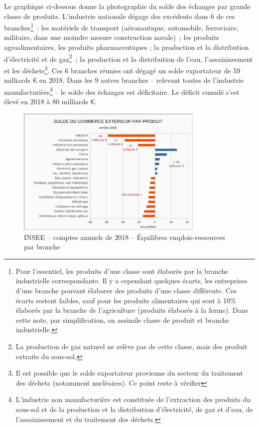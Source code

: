\documentclass[a4paper]{article}
\begin{document}
Le graphique ci-dessous donne la photographie du solde des échanges par grande classe de produits. L’industrie nationale dégage des excédents dans 6 de ces branches\footnote{Pour l’essentiel, les produits d’une classe sont élaborés par la branche industrielle correspondante. Il y a cependant quelques écarts, les entreprises d’une branche pouvant élaborer des produits d’une classe différente. Ces écarts restent faibles, sauf pour les produits alimentaires qui sont à 10\% élaborés par la branche de l’agriculture (produits élaborés à la ferme). Dans cette note, par simplification, on assimile classe de produit et branche industrielle.}~: les matériels de transport (aéronautique, automobile, ferroviaire, militaire, dans une moindre mesure construction navale)~; les produits agroalimentaires, les produits pharmaceutiques ; la production et la distribution d’électricité et de gaz\footnote{La production de gaz naturel ne relève pas de cette classe, mais des produit extraits du sous-sol.}~; la production et la distribution de l’eau, l’assainissement et les déchets\footnote{Il est possible que le solde exportateur provienne du secteur du traitement des déchets (notamment nucléaires). Ce point reste à vérifier}. Ces 6 branches réunies ont dégagé un solde exportateur de 59 milliards € en 2018.
Dans les 9 autres branches – relevant toutes de l’industrie manufacturière\footnote{L’industrie non manufacturière est constituée de l’extraction des produits du sous-sol et de la production et la distribution d’électricité, de gaz et d’eau, de l’assainissement et du traitement des déchets.} – le solde des échanges est déficitaire. Le déficit cumulé s’est élevé en 2018 à 80 milliards €.


\begin{figure}[H]
\centering
\includegraphics*[width=0.8\textwidth]{images/solde-par-produit}
\caption{INSEE – comptes annuels de 2018 – Équilibres emplois-ressources par branche}
\label{fig:solde-par-produit}
\end{figure}
\end{document}
